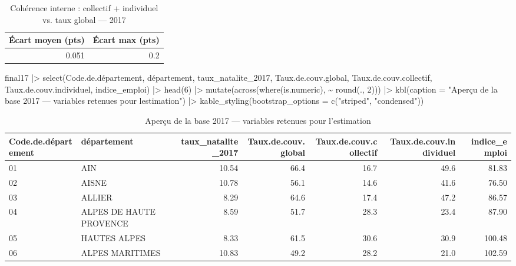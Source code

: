 \documentclass[
  letterpaper,
  DIV=11,
  numbers=noendperiod]{scrartcl}
\newenvironment{Shaded}{\begin{snugshade}}{\end{snugshade}}
\newcommand{\AttributeTok}[1]{\textcolor[rgb]{0.40,0.45,0.13}{#1}}
\newcommand{\DecValTok}[1]{\textcolor[rgb]{0.68,0.00,0.00}{#1}}
\newcommand{\FunctionTok}[1]{\textcolor[rgb]{0.28,0.35,0.67}{#1}}
\newcommand{\NormalTok}[1]{\textcolor[rgb]{0.00,0.23,0.31}{#1}}
\newcommand{\SpecialCharTok}[1]{\textcolor[rgb]{0.37,0.37,0.37}{#1}}
\newcommand{\StringTok}[1]{\textcolor[rgb]{0.13,0.47,0.30}{#1}}
\begin{document}
\begin{table}
\centering
\caption{\label{tab:verif}Cohérence interne : collectif + individuel vs. taux global — 2017}
\centering
\begin{tabular}[t]{r|r}
\hline
Écart moyen (pts) & Écart max (pts)\\
\hline
0.051 & 0.2\\
\hline
\end{tabular}
\end{table}

\begin{Shaded}
\begin{Highlighting}[]
\NormalTok{final17 }\SpecialCharTok{|\textgreater{}}
  \FunctionTok{select}\NormalTok{(Code.de.département, département, taux\_natalite\_2017,}
\NormalTok{         Taux.de.couv.global, Taux.de.couv.collectif,}
\NormalTok{         Taux.de.couv.individuel, indice\_emploi) }\SpecialCharTok{|\textgreater{}}
  \FunctionTok{head}\NormalTok{(}\DecValTok{6}\NormalTok{) }\SpecialCharTok{|\textgreater{}}
  \FunctionTok{mutate}\NormalTok{(}\FunctionTok{across}\NormalTok{(}\FunctionTok{where}\NormalTok{(is.numeric), }\SpecialCharTok{\textasciitilde{}} \FunctionTok{round}\NormalTok{(., }\DecValTok{2}\NormalTok{))) }\SpecialCharTok{|\textgreater{}}
  \FunctionTok{kbl}\NormalTok{(}\AttributeTok{caption =} \StringTok{"Aperçu de la base 2017 — variables retenues pour l\textquotesingle{}estimation"}\NormalTok{) }\SpecialCharTok{|\textgreater{}}
  \FunctionTok{kable\_styling}\NormalTok{(}\AttributeTok{bootstrap\_options =} \FunctionTok{c}\NormalTok{(}\StringTok{"striped"}\NormalTok{, }\StringTok{"condensed"}\NormalTok{))}
\end{Highlighting}
\end{Shaded}

\begin{table}
\centering
\caption{\label{tab:apercu}Aperçu de la base 2017 — variables retenues pour l'estimation}
\centering
\begin{tabular}[t]{l|l|r|r|r|r|r}
\hline
Code.de.département & département & taux\_natalite\_2017 & Taux.de.couv.global & Taux.de.couv.collectif & Taux.de.couv.individuel & indice\_emploi\\
\hline
01 & AIN & 10.54 & 66.4 & 16.7 & 49.6 & 81.83\\
\hline
02 & AISNE & 10.78 & 56.1 & 14.6 & 41.6 & 76.50\\
\hline
03 & ALLIER & 8.29 & 64.6 & 17.4 & 47.2 & 86.57\\
\hline
04 & ALPES DE HAUTE PROVENCE & 8.59 & 51.7 & 28.3 & 23.4 & 87.90\\
\hline
05 & HAUTES ALPES & 8.33 & 61.5 & 30.6 & 30.9 & 100.48\\
\hline
06 & ALPES MARITIMES & 10.83 & 49.2 & 28.2 & 21.0 & 102.59\\
\hline
\end{tabular}
\end{table}
\end{document}
